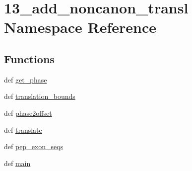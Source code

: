 \hypertarget{namespace13__add__noncanon__transl}{\section{13\-\_\-add\-\_\-noncanon\-\_\-transl Namespace Reference}
\label{namespace13__add__noncanon__transl}
}
\subsection*{Functions}
\begin{DoxyCompactItemize}
\item 
def \hyperlink{namespace13__add__noncanon__transl_a3af2a028e6eb8577a6d22b57ebc883b6}{get\-\_\-phase}
\item 
def \hyperlink{namespace13__add__noncanon__transl_a86984687243c2e47415e9f42a1717e77}{translation\-\_\-bounds}
\item 
def \hyperlink{namespace13__add__noncanon__transl_a46049f89993a4844046f924c0efb5e5e}{phase2offset}
\item 
def \hyperlink{namespace13__add__noncanon__transl_a96435bef81506f5e096529aee7e43260}{translate}
\item 
def \hyperlink{namespace13__add__noncanon__transl_a112a64de0605bdb5b9c761fd88f49a02}{pep\-\_\-exon\-\_\-seqs}
\item 
def \hyperlink{namespace13__add__noncanon__transl_a371617fe87e3fc3d046102991322bed3}{main}
\end{DoxyCompactItemize}


